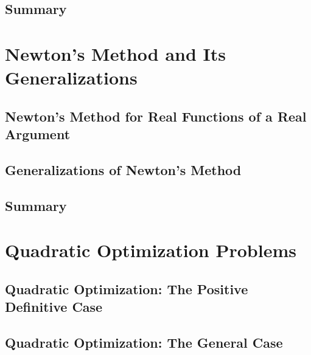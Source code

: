 \documentclass[a4paper]{article}
\begin{document}
\subsection{ Summary} %


\newpage
\section{Newton’s Method and Its Generalizations}
\subsection{ Newton's Method for Real Functions of a Real Argument} %

\subsection{ Generalizations of Newton's Method} %

\subsection{ Summary} %


\newpage
\section{Quadratic Optimization Problems}
\subsection{ Quadratic Optimization: The Positive Definitive Case} %

\subsection{ Quadratic Optimization: The General Case} %
\end{document}
